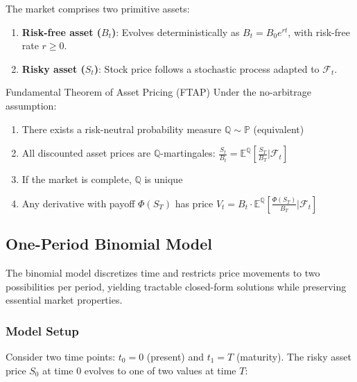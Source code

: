 \documentclass[10pt,twocolumn]{article}
\begin{document}
The market comprises two primitive assets:

\begin{enumerate}[leftmargin=*,itemsep=2pt]
    \item \textbf{Risk-free asset ($B_t$)}: Evolves deterministically as $B_t = B_0 e^{rt}$, with risk-free rate $r \geq 0$.
    \item \textbf{Risky asset ($S_t$)}: Stock price follows a stochastic process adapted to $\mathcal{F}_t$.
\end{enumerate}

\begin{theorembox}{Fundamental Theorem of Asset Pricing (FTAP)}
Under the no-arbitrage assumption:
\begin{enumerate}[itemsep=1pt]
    \item There exists a risk-neutral probability measure $\mathbb{Q} \sim \mathbb{P}$ (equivalent)
    \item All discounted asset prices are $\mathbb{Q}$-martingales: $\frac{S_t}{B_t} = \mathbb{E}^\mathbb{Q}\left[\frac{S_T}{B_T} \Big| \mathcal{F}_t\right]$
    \item If the market is complete, $\mathbb{Q}$ is unique
    \item Any derivative with payoff $\Phi(S_T)$ has price $V_t = B_t \cdot \mathbb{E}^\mathbb{Q}\left[\frac{\Phi(S_T)}{B_T} \Big| \mathcal{F}_t\right]$
\end{enumerate}
\end{theorembox}

\subsection{One-Period Binomial Model}

The binomial model discretizes time and restricts price movements to two possibilities per period, yielding tractable closed-form solutions while preserving essential market properties.

\subsubsection{Model Setup}

Consider two time points: $t_0 = 0$ (present) and $t_1 = T$ (maturity). The risky asset price $S_0$ at time $0$ evolves to one of two values at time $T$:

\begin{center}
\end{center}
\end{document}
